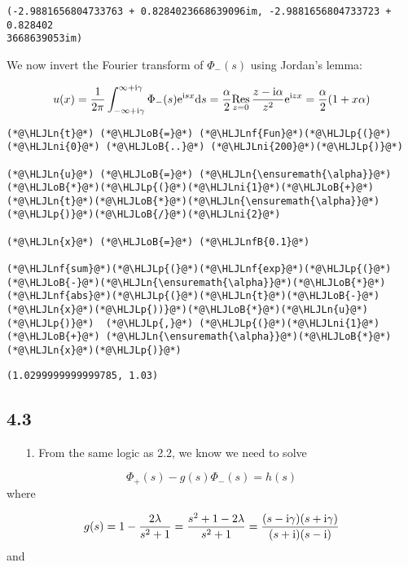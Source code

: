 \documentclass[12pt,landscape]{article}
\newcommand{\HLJLn}[1]{#1}
\newcommand{\HLJLnf}[1]{\textcolor[RGB]{66,102,213}{#1}}
\newcommand{\HLJLnfB}[1]{\textcolor[RGB]{59,151,46}{#1}}
\newcommand{\HLJLni}[1]{\textcolor[RGB]{59,151,46}{#1}}
\newcommand{\HLJLoB}[1]{\textcolor[RGB]{102,102,102}{\textbf{#1}}}
\newcommand{\HLJLp}[1]{#1}
\def\D{ {\rm d} }
\def\I{ {\rm i} }
\def\E{ {\rm e} }
\def\Res_#1{\underset{#1}{\rm Res}\,}
\begin{document}
{\begin{lstlisting}
(-2.9881656804733763 + 0.8284023668639096im, -2.9881656804733723 + 0.828402
3668639053im)
\end{lstlisting}


We now invert the Fourier transform of $\Phi_-(s)$ using Jordan's lemma:

\[
u(x) = {1 \over 2 \pi} \int_{-\infty + \I \gamma}^{\infty + \I \gamma} \Phi_-(s) \E^{\I s x} \D s = {\alpha \over 2}\Res_{z = 0} {z- \I \alpha \over z^2} \E^{\I z x}  = {\alpha \over 2} (1+x \alpha)
\]

\begin{lstlisting}
(*@\HLJLn{t}@*) (*@\HLJLoB{=}@*) (*@\HLJLnf{Fun}@*)(*@\HLJLp{(}@*)(*@\HLJLni{0}@*) (*@\HLJLoB{..}@*) (*@\HLJLni{200}@*)(*@\HLJLp{)}@*)

(*@\HLJLn{u}@*) (*@\HLJLoB{=}@*) (*@\HLJLn{\ensuremath{\alpha}}@*)(*@\HLJLoB{*}@*)(*@\HLJLp{(}@*)(*@\HLJLni{1}@*)(*@\HLJLoB{+}@*)(*@\HLJLn{t}@*)(*@\HLJLoB{*}@*)(*@\HLJLn{\ensuremath{\alpha}}@*)(*@\HLJLp{)}@*)(*@\HLJLoB{/}@*)(*@\HLJLni{2}@*)

(*@\HLJLn{x}@*) (*@\HLJLoB{=}@*) (*@\HLJLnfB{0.1}@*)

(*@\HLJLnf{sum}@*)(*@\HLJLp{(}@*)(*@\HLJLnf{exp}@*)(*@\HLJLp{(}@*)(*@\HLJLoB{-}@*)(*@\HLJLn{\ensuremath{\alpha}}@*)(*@\HLJLoB{*}@*)(*@\HLJLnf{abs}@*)(*@\HLJLp{(}@*)(*@\HLJLn{t}@*)(*@\HLJLoB{-}@*)(*@\HLJLn{x}@*)(*@\HLJLp{))}@*)(*@\HLJLoB{*}@*)(*@\HLJLn{u}@*)(*@\HLJLp{)}@*)  (*@\HLJLp{,}@*) (*@\HLJLp{(}@*)(*@\HLJLni{1}@*) (*@\HLJLoB{+}@*) (*@\HLJLn{\ensuremath{\alpha}}@*)(*@\HLJLoB{*}@*)(*@\HLJLn{x}@*)(*@\HLJLp{)}@*)
\end{lstlisting}

\begin{lstlisting}
(1.0299999999999785, 1.03)
\end{lstlisting}


\subsection{4.3}
\begin{itemize}
\item[1. ] From the same logic as 2.2, we know we need to solve

\end{itemize}
\[
\Phi_+(s) - g(s) \Phi_-(s) = h(s)
\]
where

\[
g(s) = 1 - {2 \lambda \over s^2 + 1} = {s^2 +1-2 \lambda \over s^2 + 1} = {(s- \I\gamma)(s+\I \gamma) \over (s+\I)(s-\I)}
\]
and

}
\end{document}
